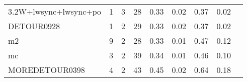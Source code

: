 {\begin{tabular}{l|r|r|r|r|r|r|r|l}
3.2W+lwsync+lwsync+po                       & 1                                                                                                 & 3                                                                                                & 28                                                                                                                   & 0.33                            & 0.02                    & {\color[HTML]{00009B} 0.37}    & 0.02                       & \cite{tracer2018}                                                  \\
DETOUR0928                                  & 1                                                                                                 & 2                                                                                                & 29                                                                                                                   & 0.33                            & 0.02                    & {\color[HTML]{00009B} 0.37}    & 0.02                       & \cite{tracer2018}                                                  \\
m2                                          & 9                                                                                                 & 2                                                                                                & 28                                                                                                                   & 0.33                            & 0.01                    & {\color[HTML]{00009B} 0.47}    & 0.12                       & \cite{tracer2018}                                                  \\
mc                                          & 3                                                                                                 & 2                                                                                                & 39                                                                                                                   & 0.34                            & 0.01                    & {\color[HTML]{00009B} 0.46}    & 0.10                       & \cite{tracer2018}                                                  \\
MOREDETOUR0398                              & 4                                                                                                 & 2                                                                                                & 43                                                                                                                   & 0.45                            & 0.02                    & {\color[HTML]{00009B} 0.64}    & 0.18                       & \cite{tracer2018}                                                  \\

\end{tabular}}
